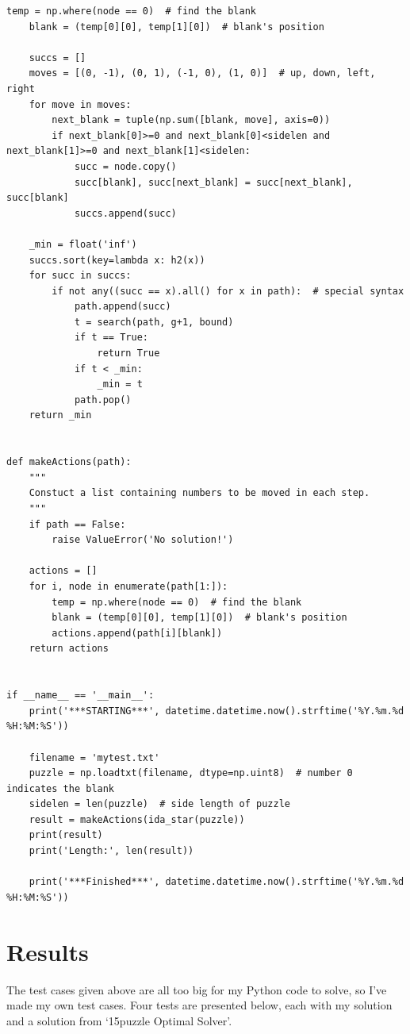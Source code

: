 \documentclass[a4paper, 11pt]{article}
\begin{document}
\begin{lstlisting}[title=main.py]
    temp = np.where(node == 0)  # find the blank
    blank = (temp[0][0], temp[1][0])  # blank's position

    succs = []
    moves = [(0, -1), (0, 1), (-1, 0), (1, 0)]  # up, down, left, right
    for move in moves:
        next_blank = tuple(np.sum([blank, move], axis=0))
        if next_blank[0]>=0 and next_blank[0]<sidelen and next_blank[1]>=0 and next_blank[1]<sidelen:
            succ = node.copy()
            succ[blank], succ[next_blank] = succ[next_blank], succ[blank]
            succs.append(succ)

    _min = float('inf')
    succs.sort(key=lambda x: h2(x))
    for succ in succs:
        if not any((succ == x).all() for x in path):  # special syntax
            path.append(succ)
            t = search(path, g+1, bound)
            if t == True:
                return True
            if t < _min:
                _min = t
            path.pop()
    return _min


def makeActions(path):
    """
    Constuct a list containing numbers to be moved in each step.
    """
    if path == False:
        raise ValueError('No solution!')

    actions = []
    for i, node in enumerate(path[1:]):
        temp = np.where(node == 0)  # find the blank
        blank = (temp[0][0], temp[1][0])  # blank's position
        actions.append(path[i][blank])
    return actions


if __name__ == '__main__':
    print('***STARTING***', datetime.datetime.now().strftime('%Y.%m.%d %H:%M:%S'))

    filename = 'mytest.txt'
    puzzle = np.loadtxt(filename, dtype=np.uint8)  # number 0 indicates the blank
    sidelen = len(puzzle)  # side length of puzzle
    result = makeActions(ida_star(puzzle))
    print(result)
    print('Length:', len(result))

    print('***Finished***', datetime.datetime.now().strftime('%Y.%m.%d %H:%M:%S'))

\end{lstlisting}


\section{Results}
The test cases given above are all too big for my Python code to solve, so I've made my own test cases. Four tests are presented below, each with my solution and a solution from `15puzzle Optimal Solver'\cite{puzzlesolver}.
\end{document}
